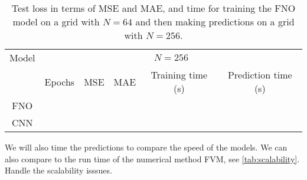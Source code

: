 \begin{table}[H]
    \centering
    \begin{tabular}{c|ccccc}
        Model & \multicolumn{5}{c}{$N = 256$} \\
        \cline{2-6}
        & Epochs & MSE & MAE & Training time (s) & Prediction time (s) \\
        \hline
        FNO  &
         &
         &
         &
         &
         \\ 
        CNN &
         &
         &
         &
         &
        
    \end{tabular}
    \caption{Test loss in terms of MSE and MAE, and time for training the FNO model on a grid with $N = 64$ and then making predictions on a grid with $N = 256$.}\label{tab:results_2D_FNO_train_64_test_256}
\end{table}



We will also time the predictions to compare the speed of the models.
We can also compare to the run time of the numerical method FVM, see \autoref{tab:scalability}.
Handle the scalability isssues.


